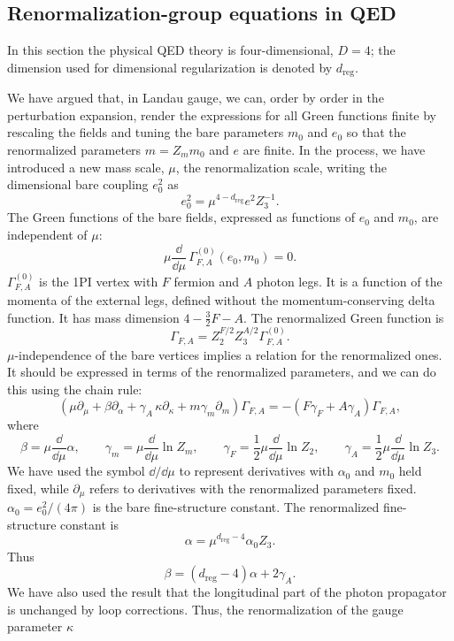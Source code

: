 \subsection{Renormalization-group equations in QED}

In this section the physical QED theory is four-dimensional, $D=4$; the
dimension used for dimensional regularization is denoted by
$d_{\mathrm{reg}}$.

We have argued that, in Landau gauge, we can, order by order in the perturbation
expansion, render the expressions for all Green functions finite by rescaling the
fields and tuning the bare parameters $m_0$ and $e_0$ so that the renormalized
parameters $m=Z_m m_0$ and $e$ are finite. In the process, we have introduced a
new mass scale, $\mu$, the renormalization scale, writing the dimensional bare
coupling $e_0^2$ as
\[
  e_0^2=\mu^{4-d_{\mathrm{reg}}}e^2Z_3^{-1}.
\]
The Green functions of the bare fields, expressed as functions of $e_0$ and
$m_0$, are independent of $\mu$:
\[
  \mu\frac{\dd}{\dd\mu}\,\Gamma^{(0)}_{F,A}(e_0,m_0)=0.
\]
$\Gamma^{(0)}_{F,A}$ is the 1PI vertex with $F$ fermion and $A$ photon legs.
It is a function of the momenta of the external legs, defined without the
momentum-conserving delta function. It has mass dimension $4-\frac32F-A$. The
renormalized Green function is
\[
  \Gamma_{F,A}=Z_2^{F/2}Z_3^{A/2}\Gamma^{(0)}_{F,A}.
\]
$\mu$-independence of the bare vertices implies a relation for the renormalized
ones. It should be expressed in terms of the renormalized parameters, and we
can do this using the chain rule:
\[
  \left(\mu\partial_\mu+\beta\partial_\alpha
  +\gamma_A\,\kappa\partial_\kappa+m\gamma_m\partial_m\right)\Gamma_{F,A}
  =-(F\gamma_F+A\gamma_A)\Gamma_{F,A},
\]
where
\[
  \beta=\mu\frac{\dd}{\dd\mu}\alpha,
  \qquad
  \gamma_m=\mu\frac{\dd}{\dd\mu}\ln Z_m,
  \qquad
  \gamma_F=\frac12\mu\frac{\dd}{\dd\mu}\ln Z_2,
  \qquad
  \gamma_A=\frac12\mu\frac{\dd}{\dd\mu}\ln Z_3.
\]
We have used the symbol $\dd/\dd\mu$ to represent derivatives with $\alpha_0$
and $m_0$ held fixed, while $\partial_\mu$ refers to derivatives with the
renormalized parameters fixed. $\alpha_0=e_0^2/(4\pi)$ is the bare
fine-structure constant. The renormalized fine-structure constant is
\[
  \alpha=\mu^{d_{\mathrm{reg}}-4}\alpha_0Z_3.
\]
Thus
\[
  \beta=(d_{\mathrm{reg}}-4)\alpha+2\gamma_A.
\]
We have also used the result that the longitudinal part of the photon
propagator is unchanged by loop corrections. Thus, the renormalization of the
gauge parameter $\kappa$

